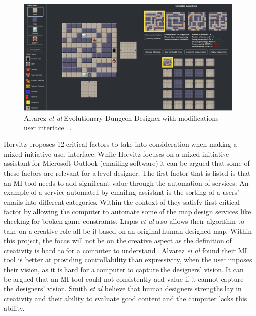 \documentclass[journal]{IEEEtran}
\begin{document}
\begin{figure}[h]
	\includegraphics[width=1.0\linewidth]{EDD2.PNG}
	\caption{ Alvarez \textit{et al} Evolutionary Dungeon Designer with modifications user interface ~\cite{alvarez2018fostering}.}
	\label{EDD2}
\end{figure} 

Horvitz \cite{horvitz1999principles} proposes 12 critical factors to take into consideration when making a mixed-initiative user interface. While Horvitz \cite{horvitz1999principles} focuses on a mixed-initiative assistant for Microsoft Outlook (emailing software) it can be argued that some of these factors are relevant for a level designer. The first factor that is listed is that an MI tool needs to add significant value through the automation of services. An example of a service automated by emailing assistant is the sorting of a users' emails into different categories. Within the context of \cite{liapis2013sentient} they satisfy \cite{horvitz1999principles} first critical factor by allowing the computer to automate some of the map design services like checking for broken game constraints. Liapis \textit{et al} \cite{liapis2013sentient} also allows their algorithm to take on a creative role all be it based on an original human designed map. Within this project, the focus will not be on the creative aspect as the definition of creativity is hard to for a computer to understand \cite{jordanous2010defining}. Alvarez \textit{et al}\cite{alvarez2018fostering} found their MI tool is better at providing controllability than expressivity, when the user imposes their vision, as it is hard for a computer to capture the designers' vision. It can be argued that an MI tool could not consistently add value if it cannot capture the designers' vision. Smith \textit{et al}\cite{smith2011tanagra} believe that human designers strengths lay in creativity and their ability to evaluate good content and the computer lacks this ability. 
\end{document}
